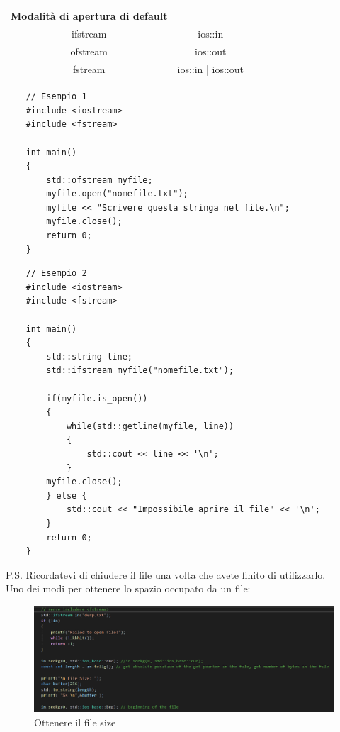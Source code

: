 \begin{tabular}{|c|c|}
	\hline
	\textbf{Modalità di apertura di default} & \textbf{} \\
	\hline
	\textsf{\small ifstream} & \textsf{\small ios::in} \\
	\textsf{\small ofstream} & \textsf{\small ios::out} \\
	\textsf{\small fstream} & \textsf{\small ios::in | ios::out} \\
	\hline
\end{tabular}

\begin{lstlisting}
	// Esempio 1
	#include <iostream>
	#include <fstream>
	
	int main()
	{
		std::ofstream myfile;
		myfile.open("nomefile.txt");
		myfile << "Scrivere questa stringa nel file.\n";
		myfile.close();
		return 0;
	}
\end{lstlisting}

\begin{lstlisting}
	// Esempio 2
	#include <iostream>
	#include <fstream>
	
	int main()
	{
		std::string line;
		std::ifstream myfile("nomefile.txt");
		
		if(myfile.is_open())
		{
			while(std::getline(myfile, line))
			{
				std::cout << line << '\n';
			}
		myfile.close();
		} else {
			std::cout << "Impossibile aprire il file" << '\n';
		}
		return 0;
	}
\end{lstlisting}

\textsf{\small P.S. Ricordatevi di chiudere il file una volta che avete finito di utilizzarlo.} \\

\textsf{\small Uno dei modi per ottenere lo spazio occupato da un file: } \\

\begin{figure}[ht]
	\centering
	\includegraphics[width=1\textwidth, height=1\textheight, keepaspectratio]{./imgs/fstream_file_size.png}
	\caption{Ottenere il file size}
	\label{fig:fstream_file_size}
\end{figure}

